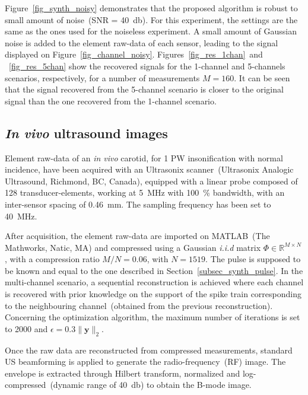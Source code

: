 \documentclass[journal]{IEEEtran}
\newcommand{\vect}[1]{\bm{#1}}
\newcommand{\mat}[1]{\mathsf{#1}}
\theoremstyle{definition}
\begin{document}
Figure~\ref{fig_synth_noisy} demonstrates that the proposed algorithm is robust to small amount of noise~(SNR = \SI{40}{\decibel}). For this experiment, the settings are the same as the ones used for the noiseless experiment. A small amount of Gaussian noise is added to the element raw-data of each sensor, leading to the signal displayed on Figure~\ref{fig_channel_noisy}. Figures~\ref{fig_res_1chan}~and ~\ref{fig_res_5chan} show the recovered signals for the \num{1}-channel and \num{5}-channels scenarios, respectively, for a number of measurements $M=160$. It can be seen that the signal recovered from the \num{5}-channel scenario is closer to the original signal than the one recovered from the \num{1}-channel scenario.

\subsection{\textit{In vivo} ultrasound images}
\label{subsec_invivo_images}
Element raw-data of an \textit{in vivo} carotid, for 1 PW insonification with normal incidence, have been acquired with an Ultrasonix scanner~(Ultrasonix Analogic Ultrasound, Richmond, BC, Canada), equipped with a linear probe composed of \num{128} transducer-elements, working at \SI{5}{\mega\hertz} with \SI{100}{\percent} bandwidth, with an inter-sensor spacing of \SI{0.46}{\milli\metre}. The sampling frequency has been set to \SI{40}{\mega\hertz}. 

After acquisition, the element raw-data are imported on MATLAB~(The Mathworks, Natic, MA) and compressed using a Gaussian \textit{i.i.d} matrix $\mat{\Phi} \in \mathbb{R}^{M \times N}$, with a compression ratio $M/N = 0.06$, with $N=1519$. The pulse is supposed to be known and equal to the one described in Section~\ref{subsec_synth_pulse}. In the multi-channel scenario, a sequential reconstruction is achieved where each channel is recovered with prior knowledge on the support of the spike train corresponding to the neighbouring channel~(obtained from the previous reconstruction). Concerning the optimization algorithm, the maximum number of iterations is set to \num{2000} and $\epsilon = 0.3 \| \vect{y} \|_2$. 

Once the raw data are reconstructed from compressed measurements, standard US beamforming is applied to generate the radio-frequency~(RF) image. The envelope is extracted through Hilbert transform, normalized and log-compressed~(dynamic range of \SI{40}{\decibel}) to obtain the B-mode image. 
\end{document}

